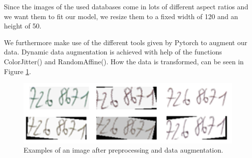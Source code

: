 Since the images of the used databases come in lots of different aspect ratios and we want them to fit our model, we resize them to a fixed width of 120 and an height of 50.

 We furthermore make use of the different tools given by Pytorch to augment our data. Dynamic data augmentation is achieved with help of the functions ColorJitter() and RandomAffine(). How the data is transformed, can be seen in Figure \ref{fig:dataAug}.

\begin{figure}
  \includegraphics[width=\linewidth]{images/Data-Augmentation.png}
  \caption{Examples of an image after preprocessing and data augmentation.}
  \label{fig:dataAug}
\end{figure}
